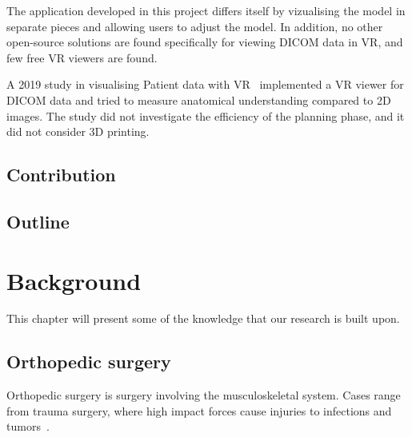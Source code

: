 \documentclass[a4paper]{report}
\begin{document}
The application developed in this project differs itself by vizualising the model in separate pieces and allowing users to adjust the model.
In addition, no other open-source solutions are found specifically for viewing DICOM data in VR, and few free VR viewers are found.

A 2019 study in visualising Patient data with VR~\cite{vertemati_virtual_2019} implemented a VR viewer for DICOM data and tried to measure anatomical understanding compared to 2D images. The study did not investigate the efficiency of the planning phase, and it did not consider 3D printing.

\section{Contribution}
\section{Outline}

\chapter{Background}\label{Background}
This chapter will present some of the knowledge that our research is built upon.

\section{Orthopedic surgery}

Orthopedic surgery is surgery involving the musculoskeletal system. Cases range from trauma surgery, where high impact forces cause injuries to infections and tumors~\cite{swiontkowski_manual_2013}.
\end{document}
